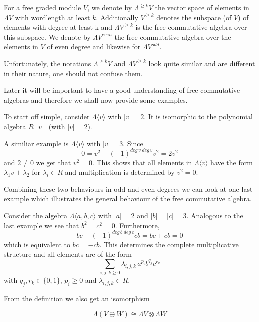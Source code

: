 \begin{Definition}
For a free graded module $V$, we denote 
by $\Lambda^{\geq k} V$ the vector space of elements in $\Lambda V$ with wordlength at least $k$.
Additionally $V^{\geq k}$ denotes the subspace (of $V$) of elements with degree at least k and ${\Lambda V}^{\geq k}$ 
is the free commutative algebra over this subspace. We denote by $\Lambda V^{even}$ the free commutative algebra over the elements in $V$ of even degree
and likewise for $\Lambda V^{odd}$.
 
\end{Definition}

Unfortunately, the notations $\Lambda^{\geq k} V$ and ${\Lambda V}^{\geq k}$  look 
quite similar and are different in their nature, one should not confuse them.


Later it will be important to have a good understanding of free commutative algebras and therefore
we shall now provide some examples.

\begin{Example}
\label{ex:FreeCommutativeEvenDegrees}
 To start off simple, consider $\Lambda \langle v \rangle$ with $|v| = 2$. 
 It is isomorphic to the polynomial algebra $R[v]$ (with $|v| = 2$).
\end{Example}

\begin{Example}
\label{ex:FreeCommutativeOddDegrees}
 A similiar example is $\Lambda \langle v \rangle$ with $|v| = 3$. Since 
 $$0 = v^2 - (-1)^{deg \, v \; deg \, v} v^2 = 2 v^2$$
 and $2 \neq 0$ we get that $v^2 = 0$. This shows that all elements in $\Lambda \langle v \rangle$
 have the form $\lambda_1 v + \lambda_2$ for $\lambda_i \in R$ and multiplication is determined by $v^2 = 0$.
\end{Example}

Combining these two behaviours in odd and even degrees we can look at one last example which
illustrates the general behaviour of the free commutative algebra.

\begin{Example}
 Consider the algebra $\Lambda \langle a,b,c \rangle$ with $|a| = 2$ and $|b| = |c| = 3$.
 Analogous to the last example we see that $b^2 = c^2 = 0$. Furthermore,
 $$ bc - (-1)^{deg \, b \; deg \, c} cb = bc + cb = 0$$
 which is equivalent to $bc = - cb$. This determines the complete multiplicative structure 
 and all elements are of the form 
 $$ \sum_{i,j,k \geq 0} \lambda_{i,j,k} \, a^{p_i} b^{q_j} c^{r_k}$$
 with  $q_j, r_k \in \lbrace 0,1 \rbrace$, $p_i \geq 0$ and $\lambda_{i,j,k} \in R$.
\end{Example}

\begin{Remark}
\label{rem:FreeCommutativeSplits}
From the definition we also get an isomorphism 

$$ \Lambda ( V \oplus W) \cong \Lambda V \otimes \Lambda W $$

\end{Remark}
